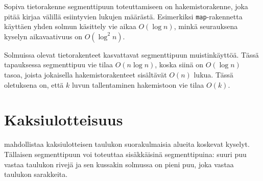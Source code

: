 Sopiva tietorakenne segmenttipuun toteuttamiseen on
hakemistorakenne, joka pitää kirjaa välillä esiintyvien
lukujen määrästä.
Esimerkiksi \texttt{map}-ra\-ken\-net\-ta käyttäen
yhden solmun käsittely vie aikaa $O(\log n)$,
minkä seurauksena kyselyn aikavaativuus on $O(\log^2 n)$.

Solmuissa olevat tietorakenteet kasvattavat
segmenttipuun muistinkäyttöä.
Tässä tapauksessa
segmenttipuu vie tilaa $O(n \log n)$,
koska siinä on $O(\log n)$ tasoa, joista
jokaisella hakemistorakenteet sisältävät $O(n)$ lukua.
Tässä oletuksena on, että $k$ luvun tallentaminen
hakemistoon vie tilaa $O(k)$.

\section{Kaksiulotteisuus}


 mahdollistaa
kaksiulotteisen taulukon
suorakulmaisia alueita koskevat kyselyt.
Tällaisen segmenttipuun voi toteuttaa
sisäkkäisinä segmenttipuina:
suuri puu vastaa taulukon rivejä
ja sen kussakin solmussa on pieni puu,
joka vastaa taulukon sarakkeita.

